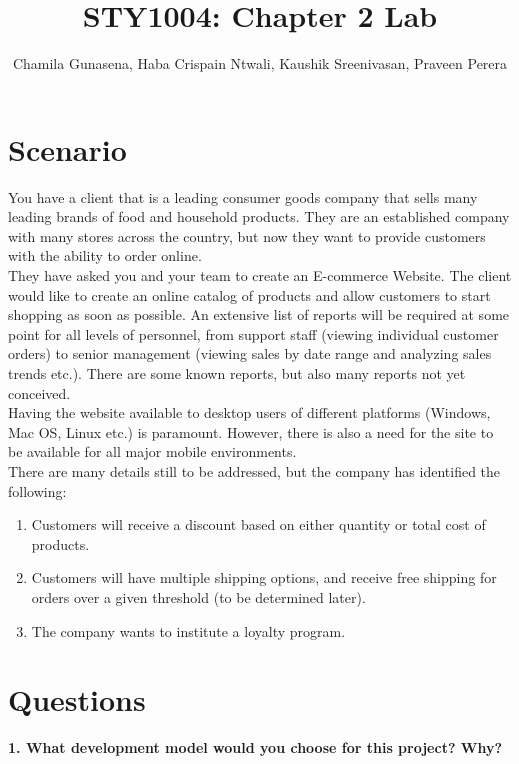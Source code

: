 \documentclass[a4paper,man,natbib]{apa6}
\title{STY1004: Chapter 2 Lab}
\author{Chamila Gunasena, Haba Crispain Ntwali, Kaushik Sreenivasan, Praveen Perera}
\affiliation{Cambrian College}
\begin{document}
\maketitle

\section{Scenario}

You have a client that is a leading consumer goods company that sells many leading brands of food and household products.  They are an established company with many stores across the country, but now they want to provide customers with the ability to order online.\\
They have asked you and your team to create an E-commerce Website.  The client would like to create an online catalog of products and allow customers to start shopping as soon as possible.  An extensive list of reports will be required at some point for all levels of personnel, from support staff (viewing individual customer orders) to senior management (viewing sales by date range and analyzing sales trends etc.).  There are some known reports, but also many reports not yet conceived.\\
Having the website available to desktop users of different platforms (Windows, Mac OS, Linux etc.) is paramount.  However, there is also a need for the site to be available for all major mobile environments.\\

There are many details still to be addressed, but the company has identified the following:\\

\begin{enumerate}
  \item Customers will receive a discount based on either quantity or total cost of products.
  \item Customers will have multiple shipping options, and receive free shipping for orders over a given threshold (to be determined later).
  \item The company wants to institute a loyalty program.
\end{enumerate}

\pagebreak
\section{Questions}

\noindent
\textbf{1. What development model would you choose for this project? Why?}\\
\end{document}
